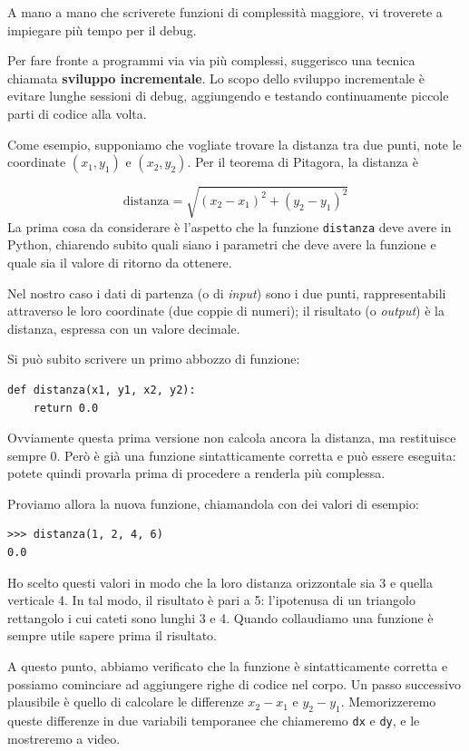 \documentclass[10pt]{book}
\begin{document}
A mano a mano che scriverete funzioni di complessità maggiore, vi troverete a impiegare più tempo per il debug.

Per fare fronte a programmi via via più complessi, suggerisco una tecnica chiamata {\bf sviluppo incrementale}. Lo scopo dello sviluppo incrementale è evitare lunghe sessioni di debug, aggiungendo e testando continuamente piccole parti di codice alla volta.

Come esempio, supponiamo che vogliate trovare la distanza tra due punti, note le coordinate $(x_1, y_1)$ e $(x_2, y_2)$.
Per il teorema di Pitagora, la distanza è

\begin{displaymath}
\mathrm{distanza} = \sqrt{(x_2 - x_1)^2 + (y_2 - y_1)^2}
\end{displaymath}
%
La prima cosa da considerare è l'aspetto che la funzione {\tt distanza} deve avere in Python, chiarendo subito quali siano i parametri che deve avere la funzione e quale sia il valore di ritorno da ottenere.

Nel nostro caso i dati di partenza (o di {\em input}) sono i due punti, rappresentabili attraverso le loro coordinate (due coppie di numeri); il risultato (o {\em output}) è la distanza, espressa con un valore decimale.

Si può subito scrivere un primo abbozzo di funzione:

\begin{verbatim}
def distanza(x1, y1, x2, y2):
    return 0.0
\end{verbatim}
%
Ovviamente questa prima versione non calcola ancora la distanza, ma restituisce sempre 0. Però è già una funzione sintatticamente corretta e può essere eseguita: potete quindi provarla prima di procedere a renderla più complessa.

Proviamo allora la nuova funzione, chiamandola con dei valori di esempio:

\begin{verbatim}
>>> distanza(1, 2, 4, 6)
0.0
\end{verbatim}
%
Ho scelto questi valori in modo che la loro distanza orizzontale sia 3 e quella verticale 4. In tal modo, il risultato è pari a 5: l'ipotenusa di un triangolo rettangolo i cui cateti sono lunghi 3 e 4. Quando collaudiamo una funzione è sempre utile sapere prima il risultato.

A questo punto, abbiamo verificato che la funzione è sintatticamente corretta e possiamo cominciare ad aggiungere righe di codice nel corpo. Un passo successivo plausibile è quello di calcolare le differenze $x_2 - x_1$ e $y_2 - y_1$.  Memorizzeremo queste differenze in due variabili temporanee che chiameremo {\tt dx} e {\tt dy}, e le mostreremo a video.
\end{document}
